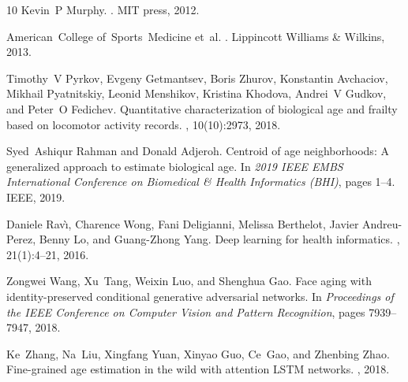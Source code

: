 \documentclass[unnumsec,webpdf,contemporary,large]{oup-authoring-template}%
\theoremstyle{thmstyleone}%
\theoremstyle{thmstyletwo}%
\theoremstyle{thmstylethree}%
\begin{document}
\begin{thebibliography}{10}
Kevin~P Murphy.
.
\newblock MIT press, 2012.

American~College of~Sports~Medicine et~al.
.
\newblock Lippincott Williams \& Wilkins, 2013.

Timothy~V Pyrkov, Evgeny Getmantsev, Boris Zhurov, Konstantin Avchaciov, Mikhail Pyatnitskiy, Leonid Menshikov, Kristina Khodova, Andrei~V Gudkov, and Peter~O Fedichev.
\newblock Quantitative characterization of biological age and frailty based on locomotor activity records.
, 10(10):2973, 2018.

Syed~Ashiqur Rahman and Donald Adjeroh.
\newblock Centroid of age neighborhoods: A generalized approach to estimate biological age.
\newblock In {\em 2019 IEEE EMBS International Conference on Biomedical \& Health Informatics (BHI)}, pages 1--4. IEEE, 2019.

Daniele Rav{\`\i}, Charence Wong, Fani Deligianni, Melissa Berthelot, Javier Andreu-Perez, Benny Lo, and Guang-Zhong Yang.
\newblock Deep learning for health informatics.
, 21(1):4--21, 2016.

Zongwei Wang, Xu~Tang, Weixin Luo, and Shenghua Gao.
\newblock Face aging with identity-preserved conditional generative adversarial networks.
\newblock In {\em Proceedings of the IEEE Conference on Computer Vision and Pattern Recognition}, pages 7939--7947, 2018.

Ke~Zhang, Na~Liu, Xingfang Yuan, Xinyao Guo, Ce~Gao, and Zhenbing Zhao.
\newblock Fine-grained age estimation in the wild with attention {LSTM} networks.
, 2018.

\end{thebibliography}

%
%

%
%
\end{document}
